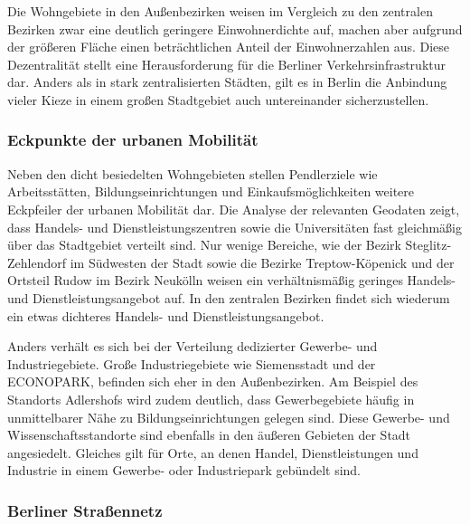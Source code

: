 
Die Wohngebiete in den Außenbezirken weisen im Vergleich zu den zentralen Bezirken zwar eine deutlich geringere Einwohnerdichte auf, machen aber aufgrund der größeren Fläche einen beträchtlichen Anteil der Einwohnerzahlen aus. Diese Dezentralität stellt eine Herausforderung für die Berliner Verkehrsinfrastruktur dar. Anders als in stark zentralisierten Städten, gilt es in Berlin die Anbindung vieler Kieze in einem großen Stadtgebiet auch untereinander sicherzustellen.

\subsubsection{Eckpunkte der urbanen Mobilität}

Neben den dicht besiedelten Wohngebieten stellen Pendlerziele wie Arbeitsstätten, Bildungseinrichtungen und Einkaufsmöglichkeiten weitere Eckpfeiler der urbanen Mobilität dar. Die Analyse der relevanten Geodaten zeigt, dass Handels- und Dienstleistungszentren sowie die Universitäten fast gleichmäßig über das Stadtgebiet verteilt sind. Nur wenige Bereiche, wie der Bezirk Steglitz-Zehlendorf im Südwesten der Stadt sowie die Bezirke Treptow-Köpenick und der Ortsteil Rudow im Bezirk Neukölln weisen ein verhältnismäßig geringes Handels- und Dienstleistungsangebot auf. In den zentralen Bezirken findet sich wiederum ein etwas dichteres Handels- und Dienstleistungsangebot.

Anders verhält es sich bei der Verteilung dedizierter Gewerbe- und Industriegebiete. Große Industriegebiete wie Siemensstadt und der ECONOPARK, befinden sich eher in den Außenbezirken. Am Beispiel des Standorts Adlershofs wird zudem deutlich, dass Gewerbegebiete häufig in unmittelbarer Nähe zu Bildungseinrichtungen gelegen sind. Diese Gewerbe- und Wissenschaftsstandorte sind ebenfalls in den äußeren Gebieten der Stadt angesiedelt. Gleiches gilt für Orte, an denen Handel, Dienstleistungen und Industrie in einem Gewerbe- oder Industriepark gebündelt sind.


\subsubsection{Berliner Straßennetz}

